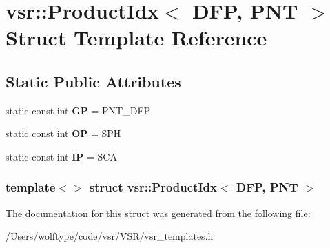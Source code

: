 \hypertarget{structvsr_1_1_product_idx_3_01_d_f_p_00_01_p_n_t_01_4}{\section{vsr\-:\-:Product\-Idx$<$ D\-F\-P, P\-N\-T $>$ Struct Template Reference}
\label{structvsr_1_1_product_idx_3_01_d_f_p_00_01_p_n_t_01_4}
}
\subsection*{Static Public Attributes}
\begin{DoxyCompactItemize}
\item 
\hypertarget{structvsr_1_1_product_idx_3_01_d_f_p_00_01_p_n_t_01_4_a0144200382b7a288e19e58c75b5ec1ec}{static const int {\bfseries G\-P} = P\-N\-T\-\_\-\-D\-F\-P}\label{structvsr_1_1_product_idx_3_01_d_f_p_00_01_p_n_t_01_4_a0144200382b7a288e19e58c75b5ec1ec}

\item 
\hypertarget{structvsr_1_1_product_idx_3_01_d_f_p_00_01_p_n_t_01_4_a0503045bed2c68cad2896e60ef8c081e}{static const int {\bfseries O\-P} = S\-P\-H}\label{structvsr_1_1_product_idx_3_01_d_f_p_00_01_p_n_t_01_4_a0503045bed2c68cad2896e60ef8c081e}

\item 
\hypertarget{structvsr_1_1_product_idx_3_01_d_f_p_00_01_p_n_t_01_4_a44e95419ee84c1174008f76a61f88cc0}{static const int {\bfseries I\-P} = S\-C\-A}\label{structvsr_1_1_product_idx_3_01_d_f_p_00_01_p_n_t_01_4_a44e95419ee84c1174008f76a61f88cc0}

\end{DoxyCompactItemize}
\subsubsection*{template$<$$>$ struct vsr\-::\-Product\-Idx$<$ D\-F\-P, P\-N\-T $>$}



The documentation for this struct was generated from the following file\-:\begin{DoxyCompactItemize}
\item 
/\-Users/wolftype/code/vsr/\-V\-S\-R/vsr\-\_\-templates.\-h\end{DoxyCompactItemize}
